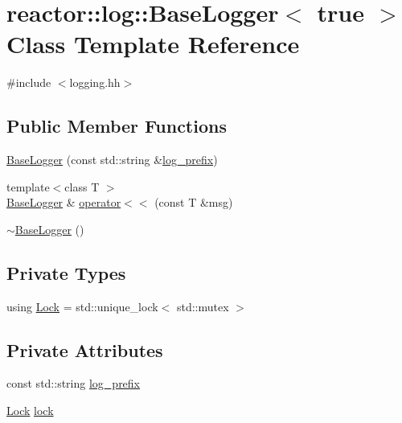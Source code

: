 \hypertarget{classreactor_1_1log_1_1BaseLogger_3_01true_01_4}{}\section{reactor\+:\+:log\+:\+:Base\+Logger$<$ true $>$ Class Template Reference}
\label{classreactor_1_1log_1_1BaseLogger_3_01true_01_4}


{\ttfamily \#include $<$logging.\+hh$>$}

\subsection*{Public Member Functions}
\begin{DoxyCompactItemize}
\item 
\hyperlink{classreactor_1_1log_1_1BaseLogger_3_01true_01_4_af11fb9ca0a141bdb7d5c14f3931735f9}{Base\+Logger} (const std\+::string \&\hyperlink{classreactor_1_1log_1_1BaseLogger_3_01true_01_4_ac12deb548273b6b993a0153ace1e6cdc}{log\+\_\+prefix})
\item 
{\footnotesize template$<$class T $>$ }\\\hyperlink{classreactor_1_1log_1_1BaseLogger}{Base\+Logger} \& \hyperlink{classreactor_1_1log_1_1BaseLogger_3_01true_01_4_a0ed6724c737335c58ddb1d3352ba58b9}{operator$<$$<$} (const T \&msg)
\item 
\hyperlink{classreactor_1_1log_1_1BaseLogger_3_01true_01_4_a1c4cf99b3f0d8c2f1c7761e7e5daa02e}{$\sim$\+Base\+Logger} ()
\end{DoxyCompactItemize}
\subsection*{Private Types}
\begin{DoxyCompactItemize}
\item 
using \hyperlink{classreactor_1_1log_1_1BaseLogger_3_01true_01_4_a145f94a8210bc4c9bbf54c3af61bd8ce}{Lock} = std\+::unique\+\_\+lock$<$ std\+::mutex $>$
\end{DoxyCompactItemize}
\subsection*{Private Attributes}
\begin{DoxyCompactItemize}
\item 
const std\+::string \hyperlink{classreactor_1_1log_1_1BaseLogger_3_01true_01_4_ac12deb548273b6b993a0153ace1e6cdc}{log\+\_\+prefix}
\item 
\hyperlink{classreactor_1_1log_1_1BaseLogger_3_01true_01_4_a145f94a8210bc4c9bbf54c3af61bd8ce}{Lock} \hyperlink{classreactor_1_1log_1_1BaseLogger_3_01true_01_4_a7a9e073069a113bdabc80230f9cefb12}{lock}
\end{DoxyCompactItemize}
